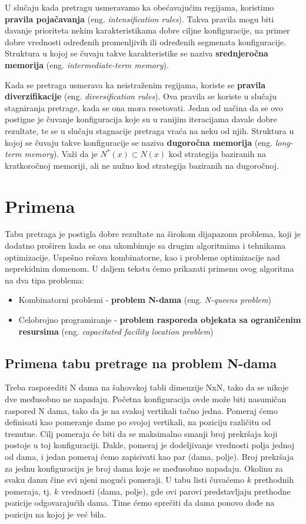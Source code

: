 \documentclass[a4paper]{article}
\begin{document}
U slučaju kada pretragu usmeravamo ka obećavajućim regijama, koristimo \textbf{pravila pojačavanja} (eng. \textit{intensification rules}). Takva pravila mogu biti davanje prioriteta nekim karakteristikama dobre ciljne konfiguracije, na primer dobre vrednosti određenih promenljivih ili određenih segmenata konfiguracije. Struktura u kojoj se čuvaju takve karakteristike se naziva \textbf{srednjeročna memorija} (eng. \textit{intermediate-term memory}).


Kada se pretraga usmerava ka neistraženim regijama, koriste se \textbf{pravila diverzifikacije} (eng. \textit{diversification rules}). Ova pravila se koriste u slučaju stagniranja pretrage, kada se ona mora resetovati. Jedan od načina da se ovo postigne je čuvanje konfiguracija koje su u ranijim iteracijama davale dobre rezultate, te se u slučaju stagnacije pretraga vraća na neku od njih. Struktura u kojoj se čuvaju takve konfiguracije se naziva \textbf{dugoročna memorija} (eng. \textit{long-term memory}).
 Važi da je $N^*(x)\subset N(x)$ kod strategija baziranih na kratkoročnoj memoriji, ali ne nužno kod strategija baziranih na dugoročnoj. \cite{tabusearchbook}\\

\section{Primena}
Tabu pretraga je postigla dobre rezultate na širokom dijapazonu problema, koji je dodatno proširen kada se ona ukombinuje sa drugim algoritmima i tehnikama optimizacije. Uspešno rešava kombinatorne, kao i probleme optimizacije nad neprekidnim domenom. \cite{yugobrief} U daljem tekstu ćemo prikazati primenu ovog algoritma na dva tipa problema:
\begin{itemize}
    \item Kombinatorni problemi - \textbf{problem N-dama} (eng. \textit{N-queens problem})
    \item Celobrojno programiranje - \textbf{problem rasporeda objekata sa ograničenim resursima} (eng. \textit{capacitated facility location problem})
\end{itemize}

\subsection{Primena tabu pretrage na problem N-dama}
Treba rasporediti N dama na šahovskoj tabli dimenzije NxN, tako da se nikoje dve međusobno ne napadaju. Početna konfiguracija ovde može biti nasumičan raspored N dama, tako da je na svakoj vertikali tačno jedna. Pomeraj ćemo definisati kao pomeranje dame po svojoj vertikali, na poziciju različitu od trenutne. Cilj pomeraja će biti da se maksimalno smanji broj prekršaja koji postoje u toj konfiguraciji. Dakle, pomeraj je dodeljivanje vrednosti polja jednoj od dama, i jedan pomeraj ćemo zapisivati kao par (dama, polje). Broj prekršaja za jednu konfiguraciju je broj dama koje se međusobno napadaju. Okolinu za svaku damu čine svi njeni mogući pomeraji. U tabu listi čuvaćemo $k$ prethodnih pomeraja, tj. $k$ vrednosti (dama, polje), gde ovi parovi predstavljaju prethodne pozicije odgovarajućih dama. Time ćemo sprečiti da dama ponovo dođe na poziciju na kojoj je već bila.
\end{document}
